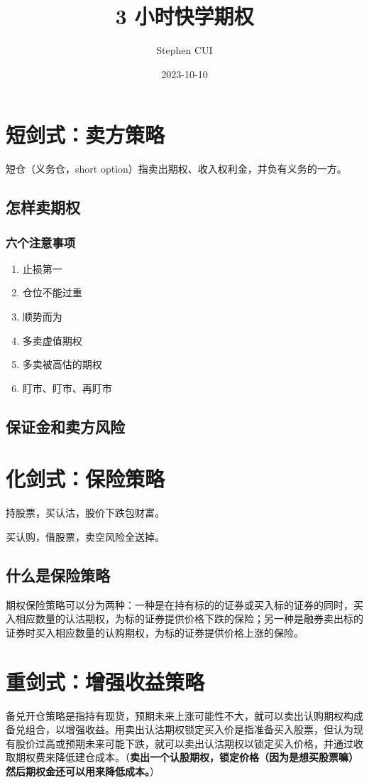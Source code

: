 \documentclass{article}
\title{3 小时快学期权}
\author{Stephen CUI}
\date{2023-10-10}
\begin{document}
\maketitle
\section{短剑式：卖方策略}
短仓（义务仓，short option）指卖出期权、收入权利金，并负有义务的一方。
\subsection{怎样卖期权}
\subsubsection*{六个注意事项}
\begin{enumerate}
    \item 止损第一
    \item 仓位不能过重
    \item 顺势而为
    \item 多卖虚值期权
    \item 多卖被高估的期权
    \item 盯市、盯市、再盯市
\end{enumerate}
\subsection{保证金和卖方风险}
\section{化剑式：保险策略}
持股票，买认沽，股价下跌包财富。

买认购，借股票，卖空风险全送掉。

\subsection{什么是保险策略}
期权保险策略可以分为两种：一种是在持有标的的证券或买入标的证券的同时，买入相应数量的认沽期权，为标的证券提供价格下跌的保险；另一种是融券卖出标的证券时买入相应数量的认购期权，为标的证券提供价格上涨的保险。
\section{重剑式：增强收益策略}
备兑开仓策略是指持有现货，预期未来上涨可能性不大，就可以卖出认购期权构成备兑组合，以增强收益。用卖出认沽期权锁定买入价是指准备买入股票，但认为现有股价过高或预期未来可能下跌，就可以卖出认沽期权以锁定买入价格，并通过收取期权费来降低建仓成本。（\textbf{卖出一个认股期权，锁定价格（因为是想买股票嘛）然后期权金还可以用来降低成本。}）
\end{document}
